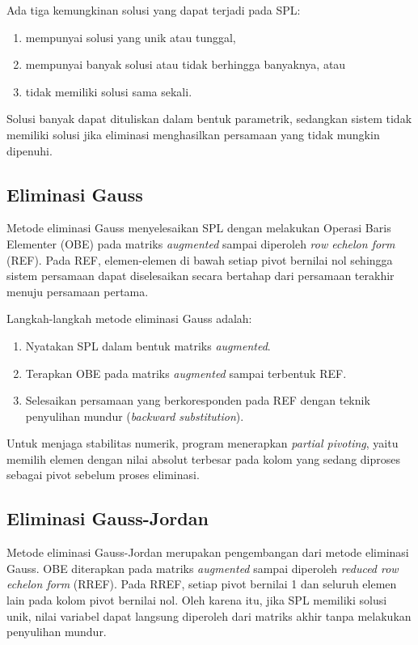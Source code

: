 \documentclass[12pt,a4paper]{report}
\begin{document}
Ada tiga kemungkinan solusi yang dapat terjadi pada SPL:
\begin{enumerate}
    \item mempunyai solusi yang unik atau tunggal,
    \item mempunyai banyak solusi atau tidak berhingga banyaknya, atau
    \item tidak memiliki solusi sama sekali.
\end{enumerate}
Solusi banyak dapat dituliskan dalam bentuk parametrik, sedangkan sistem tidak memiliki solusi jika eliminasi menghasilkan persamaan yang tidak mungkin dipenuhi. \cite{pakrin-solusi}

\subsection{Eliminasi Gauss}

Metode eliminasi Gauss menyelesaikan SPL dengan melakukan Operasi Baris
Elementer (OBE) pada matriks \textit{augmented} sampai diperoleh
\textit{row echelon form} (REF). Pada REF, elemen-elemen di bawah setiap
pivot bernilai nol sehingga sistem persamaan dapat diselesaikan secara
bertahap dari persamaan terakhir menuju persamaan pertama. \cite{pakrin-spl1}

Langkah-langkah metode eliminasi Gauss adalah:
\begin{enumerate}
    \item Nyatakan SPL dalam bentuk matriks \textit{augmented}.
    \item Terapkan OBE pada matriks \textit{augmented} sampai terbentuk REF.
    \item Selesaikan persamaan yang berkoresponden pada REF dengan teknik
    penyulihan mundur (\textit{backward substitution}).
\end{enumerate}
\cite{pakrin-spl1}

Untuk menjaga stabilitas numerik, program menerapkan \textit{partial pivoting},
yaitu memilih elemen dengan nilai absolut terbesar pada kolom yang sedang
diproses sebagai pivot sebelum proses eliminasi. \cite{tubes}

\subsection{Eliminasi Gauss-Jordan}

Metode eliminasi Gauss-Jordan merupakan pengembangan dari metode eliminasi
Gauss. OBE diterapkan pada matriks \textit{augmented} sampai diperoleh
\textit{reduced row echelon form} (RREF). Pada RREF, setiap pivot bernilai
1 dan seluruh elemen lain pada kolom pivot bernilai nol. Oleh karena itu,
jika SPL memiliki solusi unik, nilai variabel dapat langsung diperoleh dari
matriks akhir tanpa melakukan penyulihan mundur. \cite{pakrin-spl2}
\end{document}
